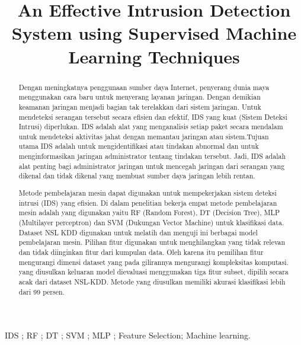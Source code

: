 \documentclass[conference]{IEEEtran}
\begin{document}
\title{An Effective Intrusion Detection System using Supervised Machine Learning Techniques}

\author{
}

\maketitle

\begin{abstract}
Dengan meningkatnya penggunaan sumber daya Internet, penyerang dunia maya menggunakan cara baru untuk menyerang layanan jaringan. Dengan demikian keamanan jaringan menjadi bagian tak terelakkan dari sistem jaringan. Untuk mendeteksi serangan tersebut secara efisien dan efektif, IDS yang kuat (Sistem Deteksi Intrusi) diperlukan. IDS adalah alat yang menganalisis setiap paket secara mendalam untuk mendeteksi aktivitas jahat dengan memantau jaringan atau sistem.Tujuan utama IDS adalah untuk mengidentifikasi atau tindakan abnormal dan untuk menginformasikan jaringan administrator tentang tindakan tersebut. Jadi, IDS adalah alat penting bagi administrator jaringan untuk mencegah jaringan dari serangan yang dikenal dan tidak dikenal yang membuat sumber daya jaringan lebih rentan. 

Metode pembelajaran mesin dapat digunakan untuk mempekerjakan sistem deteksi intrusi (IDS) yang efisien. Di dalam penelitian bekerja empat metode pembelajaran mesin adalah yang digunakan yaitu RF (Random Forest), DT (Decision Tree), MLP (Multilayer perceptron) dan SVM (Dukungan Vector Machine) untuk klasifikasi data. Dataset NSL KDD digunakan untuk melatih dan menguji ini berbagai model pembelajaran mesin. Pilihan fitur digunakan untuk menghilangkan yang tidak relevan dan tidak diinginkan fitur dari kumpulan data. Oleh karena itu pemilihan fitur mengurangi dimensi dataset yang pada gilirannya mengurangi kompleksitas komputasi. yang diusulkan keluaran model dievaluasi menggunakan tiga fitur subset, dipilih secara acak dari dataset NSL-KDD. Metode yang diusulkan memiliki akurasi klasifikasi lebih dari 99 persen.
\end{abstract}

\begin{IEEEkeywords}
IDS ; RF ; DT ; SVM ; MLP ; Feature Selection; Machine learning.
\end{IEEEkeywords}
\end{document}
